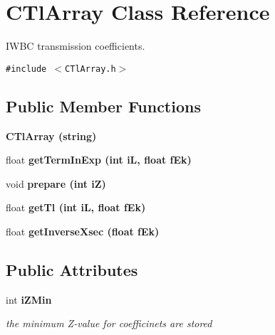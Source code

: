 \section{CTl\-Array Class Reference}
\label{classCTlArray}
IWBC transmission coefficients.  


{\tt \#include $<$CTl\-Array.h$>$}

\subsection*{Public Member Functions}
\begin{CompactItemize}
\item 
\bf{CTl\-Array} (string)
\item 
float \bf{get\-Term\-In\-Exp} (int i\-L, float f\-Ek)
\item 
void \bf{prepare} (int i\-Z)
\item 
float \bf{get\-Tl} (int i\-L, float f\-Ek)
\item 
float \bf{get\-Inverse\-Xsec} (float f\-Ek)
\end{CompactItemize}
\subsection*{Public Attributes}
\begin{CompactItemize}
\item 
int \bf{i\-ZMin}\label{classCTlArray_e3c9a7b0480c4bcff98f10970ed99051}

\begin{CompactList}\small\item\em the minimum Z-value for coefficinets are stored \item\end{CompactList}\end{CompactItemize}
